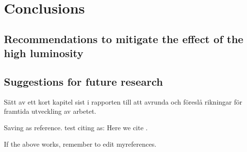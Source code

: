 \chapter{Conclusions}\label{cha:conc}
\section{Recommendations to mitigate the effect of the high luminosity}
\section{Suggestions for future research}




%
Sätt av ett kort kapitel sist i rapporten till att avrunda och föreslå rikningar för framtida utveckling av arbetet.


Saving as reference.
test citing as: Here we cite \citet{Duck:2005} \citep{Duck:2005}.

If the above works, remember to edit myreferences.
